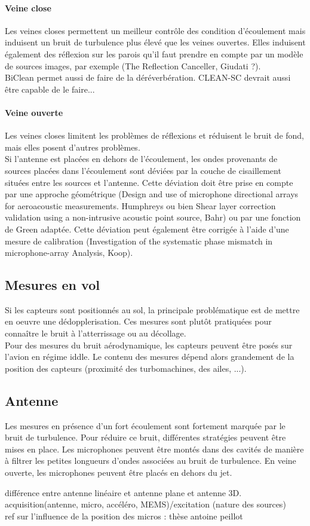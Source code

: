 \paragraph{Veine close}
 Les veines closes permettent un meilleur contrôle des condition d'écoulement mais induisent un bruit de turbulence plus élevé que les veines ouvertes. Elles induisent également des réflexion sur les parois qu'il faut prendre en compte par un modèle de sources images, par exemple (The Reflection Canceller, Giudati ?).\\
 BiClean permet aussi de faire de la déréverbération. CLEAN-SC devrait aussi être capable de le faire...
 
 \paragraph{Veine ouverte}
 Les veines closes limitent les problèmes de réflexions et réduisent le bruit de fond, mais elles posent d'autres problèmes.\\
 Si l'antenne est placées en dehors de l'écoulement, les ondes provenants de sources placées dans l'écoulement sont déviées par la couche de cisaillement situées entre les sources et l'antenne. Cette déviation doit être prise en compte par une approche géométrique (Design and use of microphone directional arrays for aeroacoustic measurements. Humphreys ou bien Shear layer correction validation using a non-intrusive acoustic point source, Bahr) ou par une fonction de Green adaptée. Cette déviation peut également être corrigée à l'aide d'une mesure de calibration (Investigation  of  the  systematic  phase  mismatch in  microphone-array  Analysis, Koop).


\subsection{Mesures en vol}
Si les capteurs sont positionnés au sol, la principale problématique est de mettre en oeuvre une dédopplerisation. Ces mesures sont plutôt pratiquées pour connaître le bruit à l’atterrissage ou au décollage.\\
Pour des mesures du bruit aérodynamique, les capteurs peuvent être posés sur l'avion en régime iddle. Le contenu des mesures dépend alors grandement de la position des capteurs (proximité des turbomachines, des ailes, ...).



\subsection{Antenne}
Les mesures en présence d'un fort écoulement sont fortement marquée par le bruit de turbulence. Pour réduire ce bruit, différentes stratégies peuvent être mises en place. Les microphones peuvent être montés dans des cavités de manière à filtrer les petites longueurs d'ondes associées au bruit de turbulence. En veine ouverte, les microphones peuvent être placés en dehors du jet.  


différence entre antenne linéaire et antenne plane et antenne 3D.\\

acquisition(antenne, micro, accéléro, MEMS)/excitation (nature des sources)\\

ref sur l'influence de la position des micros : thèse antoine peillot\\






